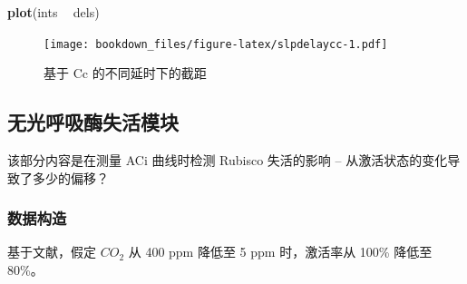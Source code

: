 \documentclass[
]{krantz}
\makeatletter
\newenvironment{Shaded}{\begin{snugshade}}{\end{snugshade}}
\newcommand{\KeywordTok}[1]{\textcolor[rgb]{0.13,0.29,0.53}{\textbf{#1}}}
\newcommand{\NormalTok}[1]{#1}
\newcommand{\OperatorTok}[1]{\textcolor[rgb]{0.81,0.36,0.00}{\textbf{#1}}}
\newcommand{\StringTok}[1]{\textcolor[rgb]{0.31,0.60,0.02}{#1}}
\newenvironment{kframe}{%
\medskip{}
\setlength{\fboxsep}{.8em}
 \def\at@end@of@kframe{}%
 \ifinner\ifhmode%
  \def\at@end@of@kframe{\end{minipage}}%
  \begin{minipage}{\columnwidth}%
 \fi\fi%
 \def\FrameCommand##1{\hskip\@totalleftmargin \hskip-\fboxsep
 \colorbox{shadecolor}{##1}\hskip-\fboxsep
     \hskip-\linewidth \hskip-\@totalleftmargin \hskip\columnwidth}%
 \MakeFramed {\advance\hsize-\width
   \@totalleftmargin\z@ \linewidth\hsize
   \@setminipage}}%
 {\par\unskip\endMakeFramed%
 \at@end@of@kframe}
\renewenvironment{Shaded}{\begin{kframe}}{\end{kframe}}
\makeatother
\begin{document}
\begin{Shaded}
\begin{Highlighting}[]
\KeywordTok{plot}\NormalTok{(ints }\OperatorTok{~}\StringTok{ }\NormalTok{dels)}
\end{Highlighting}
\end{Shaded}

\begin{figure}
\centering
\texttt{[image: bookdown\_files/figure-latex/slpdelaycc-1.pdf]}
\caption{\label{fig:slpdelaycc}基于 Cc 的不同延时下的截距}
\end{figure}

\hypertarget{multi7}{%
\subsection{无光呼吸酶失活模块}\label{multi7}}

该部分内容是在测量 ACi 曲线时检测 Rubisco 失活的影响 -- 从激活状态的变化导致了多少的偏移？

\hypertarget{multi8}{%
\subsubsection{数据构造}\label{multi8}}

基于文献，假定 \(CO_2\) 从 400 ppm 降低至 5 ppm 时，激活率从 100\% 降低至 80\%。
\end{document}
